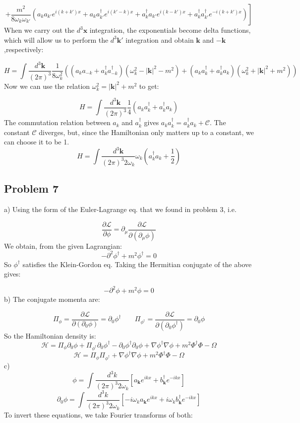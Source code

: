 \documentclass[12 pt]{article}
\begin{document}
\[ \left.  +  \frac{m^2}{8\omega_{k}\omega_{k'}} \left(  a_{k}a_{k'} e^{i(k+k')x}  +   a_{k}a^{\dagger}_{k'} e^{i(k'-k)x}  +   a^{\dagger}_{k}a_{k'} e^{i(k-k')x}  +   a^{\dagger}_{k}a^{\dagger}_{k'} e^{-i(k+k')x} \right) \right]  \]
When we carry out the $d^3 \mathbf{x}$ integration, the exponentials become delta functions, which will allow us to perform the $d^3 \mathbf{k'}$ integration and obtain $\mathbf{k}$ and $-\mathbf{k}$,respectively:

\[  H = \int  \frac{d^3 \mathbf{k}}{(2\pi)^3} \frac{1}{8\omega_{k}^2}\left( (a_k a_{-k} + a^{\dagger}_k a^{\dagger}_{-k})(\omega_{k}^2 - |\mathbf{k}|^2 - m^2) +  (a_k a^{\dagger}_{k} + a^{\dagger}_k a_{k})(\omega_{k}^2 + |\mathbf{k}|^2 + m^2) \right) \]
Now we can use the relation $\omega_{k}^2 = |\mathbf{k}|^2 + m^2$ to get:

\[   H = \int  \frac{d^3 \mathbf{k}}{(2\pi)^3} \frac{1}{4}  (a_k a^{\dagger}_{k} + a^{\dagger}_k a_{k}) \]
The commutation relation between $a_k$ and $a^{\dagger}_{k}$ gives $a_k a^{\dagger}_{k} = a^{\dagger}_{k} a_k + \mathcal{C}$. The constant $\mathcal{C}$ diverges, but, since the Hamiltonian only matters up to a constant, we can choose it to be 1.
\[   H = \int  \frac{d^3 \mathbf{k}}{(2\pi)^3 2\omega_k} \omega_k (a^{\dagger}_k a_{k} + \frac{1}{2}) \]


\subsection*{Problem 7}
a) Using the form of the Euler-Lagrange eq. that we found in problem 3, i.e.

\[  \frac{\partial \mathcal{L}}{\partial \phi} = \partial_{\mu} \frac{\partial \mathcal{L}}{\partial  (\partial_{\mu}\phi)}  \]
We obtain, from the given Lagrangian:
\[ -\partial^2 \phi^{\dagger} + m^2\phi^{\dagger} = 0  \]
So $\phi^{\dagger}$ satisfies the Klein-Gordon eq. Taking the Hermitian conjugate of the above gives:

\[   -\partial^2 \phi + m^2\phi = 0  \]
b) The conjugate momenta are:

 \[  \Pi_{\phi} = \frac{\partial \mathcal{L}}{\partial(\partial_0 \phi)} = \partial_0 \phi^{\dagger} \;\;\;\;\;\;\; \Pi_{\phi^{\dagger}} = \frac{\partial \mathcal{L}}{\partial(\partial_0 \phi^{\dagger})} = \partial_0 \phi  \]
So the Hamiltonian density is:
\[  \mathcal{H} =   \Pi_{\phi} \partial_0 \phi + \Pi_{\phi^{\dagger}} \partial_0 \phi^{\dagger} -  \partial_0 \phi^{\dagger} \partial_0 \phi + \nabla \phi^{\dagger} \nabla \phi  + m^2 \Phi^{\dagger} \Phi - \Omega  \]
\[  \mathcal{H} =   \Pi_{\phi} \Pi_{\phi^{\dagger}} + \nabla \phi^{\dagger} \nabla \phi  + m^2 \Phi^{\dagger} \Phi - \Omega  \]
c) \[ \phi = \int \frac{d^3 k}{(2\pi)^3 2\omega_k} \left[  a_{\mathbf{k}} e^{ikx} + b^{\dagger}_{\mathbf{k}} e^{-ikx}  \right] \]
\[ \partial_0 \phi = \int \frac{d^3 k}{(2\pi)^3 2\omega_k} \left[-i\omega_{k}  a_{\mathbf{k}} e^{ikx} + i\omega_k b^{\dagger}_{\mathbf{k}} e^{-ikx}  \right] \]
To invert these equations, we take Fourier transforms of both:
\end{document}
